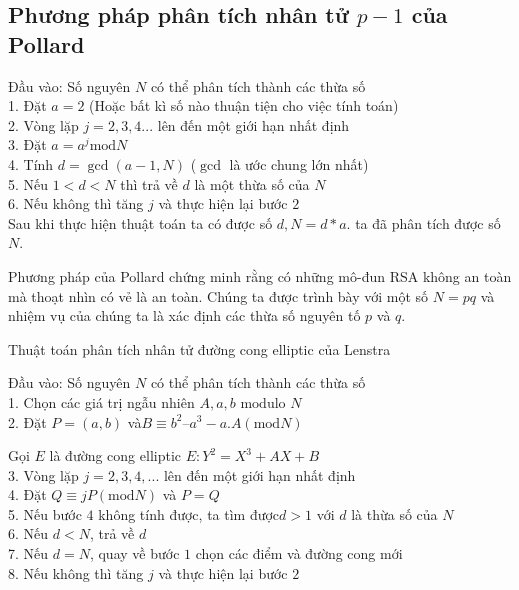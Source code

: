 \documentclass[13pt,a4paper,oneside,openany]{book}
\theoremstyle{definition}
\begin{document}
\subsection{Phương pháp phân tích nhân tử $ p - 1 $ của Pollard}
Đầu vào: Số nguyên $ N $ có thể phân tích thành các thừa số\\
1. Đặt $ a = 2 $ (Hoặc bất kì số nào thuận tiện cho việc tính toán)\\
2. Vòng lặp $ j = 2,3,4... $ lên đến một giới hạn nhất định\\
3. Đặt $ a = a^j  \text{mod} N$\\
4. Tính $ d =\gcd(a-1, N) $ ($ \gcd $ là ước chung lớn nhất)\\
5. Nếu $ 1 < d < N $ thì trả về $ d $ là một thừa số của $ N $\\
6. Nếu không thì tăng $ j $ và thực hiện lại bước $ 2 $\\
Sau khi thực hiện thuật toán ta có được số $ d, N = d*a $. ta đã phân tích được số
$ N $.

Phương pháp của Pollard chứng minh rằng có những mô-đun RSA không an toàn
mà thoạt nhìn có vẻ là an toàn. Chúng ta được trình bày với một số $ N = pq $ và
nhiệm vụ của chúng ta là xác định các thừa số nguyên tố $ p $ và $ q $.

Thuật toán phân tích nhân tử đường cong elliptic của Lenstra

Đầu vào: Số nguyên $ N $ có thể phân tích thành các thừa số
\\
1. Chọn các giá trị ngẫu nhiên $ A, a, b $  $ \text{modulo} $ $  N $\\
2. Đặt $ P = (a,b) $ và$  B \equiv b^2 – a^3 - a.A (\text{mod} N)$

Gọi $ E $ là đường cong elliptic $ E: Y^2 = X^3 + AX + B $\\
3. Vòng lặp $ j = 2,3,4,...$ lên đến một giới hạn nhất định\\
4. Đặt $ Q \equiv jP ( \text{mod} N) $ và $ P = Q $\\
5. Nếu bước $ 4 $ không tính được, ta tìm được$  d >1 $ với $ d $ là thừa số của $ N $\\
6. Nếu $ d < N $, trả về $ d $\\
7. Nếu $ d = N $, quay về bước $ 1 $ chọn các điểm và đường cong mới\\
8. Nếu không thì tăng $ j $ và thực hiện lại bước $ 2 $
\end{document}

